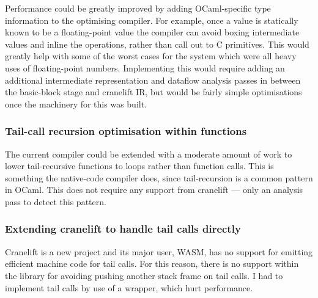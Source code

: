 Performance could be greatly improved by adding OCaml-specific type information to the optimising
compiler. For example, once a value is statically known to be a floating-point value the compiler
can avoid boxing intermediate values and inline the operations, rather than call out to C
primitives. This would greatly help with some of the worst cases for the system which were all
heavy uses of floating-point numbers. Implementing this would require adding an additional
intermediate representation and dataflow analysis passes in between the basic-block stage and
cranelift IR, but would be fairly simple optimisations once the machinery for this was built.

\subsubsection{Tail-call recursion optimisation within functions}

The current compiler could be extended with a moderate amount of work to lower tail-recursive
functions to loops rather than function calls. This is something the native-code compiler does,
since tail-recursion is a common pattern in OCaml. This does not require any support from cranelift
--- only an analysis pass to detect this pattern.

\subsubsection{Extending cranelift to handle tail calls directly}

Cranelift is a new project and its major user, WASM, has no support for emitting efficient machine
code for tail calls.  For this reason, there is no support within the library for avoiding pushing
another stack frame on tail calls. I had to implement tail calls by use of a wrapper, which hurt
performance.
